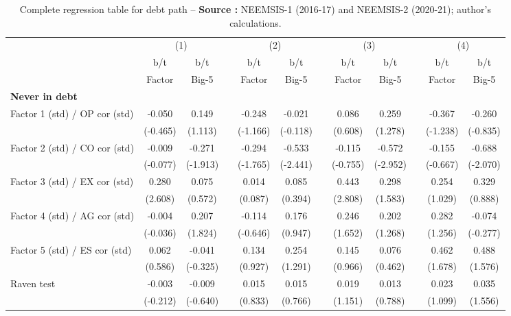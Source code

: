 {\tiny\tabcolsep=0pt
    \begin{longtable}{@{\extracolsep{\fill}}lccccccccccc}
	\caption{Complete regression table for debt path --  \textbf{Source :} NEEMSIS-1 (2016-17) and NEEMSIS-2 (2020-21); author's calculations.} \\
    \toprule
      & \multicolumn{2}{c}{(1)} &   & \multicolumn{2}{c}{(2)} &   & \multicolumn{2}{c}{(3)} &   & \multicolumn{2}{c}{(4)} \\
\cmidrule{2-3}\cmidrule{5-6}\cmidrule{8-9}\cmidrule{11-12}      & b/t & b/t &   & b/t & b/t &   & b/t & b/t &   & b/t & b/t \\
      & Factor & Big-5 &   & Factor & Big-5 &   & Factor & Big-5 &   & Factor & Big-5 \\
    \midrule
    \textbf{Never in debt} &   &   &   &   &   &   &   &   &   &   &  \\
    Factor 1 (std) / OP cor (std) & -0.050 & 0.149 &   & -0.248 & -0.021 &   & 0.086 & 0.259 &   & -0.367 & -0.260 \\
      & (-0.465) & (1.113) &   & (-1.166) & (-0.118) &   & (0.608) & (1.278) &   & (-1.238) & (-0.835) \\
    Factor 2 (std) / CO cor (std) & -0.009 & -0.271 &   & -0.294 & -0.533 &   & -0.115 & -0.572 &   & -0.155 & -0.688 \\
      & (-0.077) & (-1.913) &   & (-1.765) & (-2.441) &   & (-0.755) & (-2.952) &   & (-0.667) & (-2.070) \\
    Factor 3 (std) / EX cor (std) & 0.280 & 0.075 &   & 0.014 & 0.085 &   & 0.443 & 0.298 &   & 0.254 & 0.329 \\
      & (2.608) & (0.572) &   & (0.087) & (0.394) &   & (2.808) & (1.583) &   & (1.029) & (0.888) \\
    Factor 4 (std) / AG cor (std) & -0.004 & 0.207 &   & -0.114 & 0.176 &   & 0.246 & 0.202 &   & 0.282 & -0.074 \\
      & (-0.036) & (1.824) &   & (-0.646) & (0.947) &   & (1.652) & (1.268) &   & (1.256) & (-0.277) \\
    Factor 5 (std) / ES cor (std) & 0.062 & -0.041 &   & 0.134 & 0.254 &   & 0.145 & 0.076 &   & 0.462 & 0.488 \\
      & (0.586) & (-0.325) &   & (0.927) & (1.291) &   & (0.966) & (0.462) &   & (1.678) & (1.576) \\
    Raven test & -0.003 & -0.009 &   & 0.015 & 0.015 &   & 0.019 & 0.013 &   & 0.023 & 0.035 \\
      & (-0.212) & (-0.640) &   & (0.833) & (0.766) &   & (1.151) & (0.788) &   & (1.099) & (1.556) \\

\end{longtable}}
